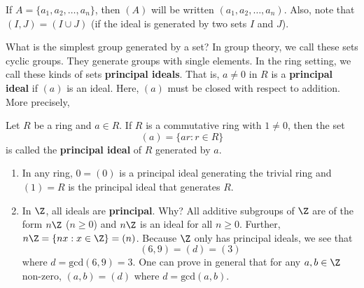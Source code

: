 If \( A = \{ {a}_{1}, {a}_{2}, \dots, {a}_{n} \}  \), then \( (A) \) will be written \( ({a}_{1}, {a}_{2}, \dots, {a}_{n}) \). Also, note that \( (I,J) = (I \cup J) \) (if the ideal is generated by two sets \( I  \) and \( J  \)).

What is the simplest group generated by a set? In group theory, we call these sets cyclic groups. They generate groups with single elements. In the ring setting, we call these kinds of sets \textbf{principal ideals}. That is, \( a \neq 0  \) in \( R  \) is a \textbf{principal ideal} if \( (a)  \) is an ideal. Here, \( (a) \) must be closed with respect to addition. More precisely, 

\begin{definition}
    Let \( R  \) be a ring and \( a \in R  \). If \( R  \) is a commutative ring with \( 1 \neq 0  \), then the set
    \[  (a) = \{  ar : r \in R  \}  \]
    is called the \textbf{principal ideal} of \( R  \) generated by \( a  \).
\end{definition}

\begin{eg}
   \begin{enumerate}
       \item[(1)] In any ring, \( 0 = (0)  \) is a principal ideal generating the trivial ring and \( (1) = R  \) is the principal ideal that generates \( R  \).
       \item[(2)] In \( \Z  \), all ideals are \textbf{principal}. Why? All additive subgroups of \( \Z  \) are of the form \( n \Z  \) (\( n \geq 0  \)) and \( n \Z  \) is an ideal for all \( n \geq 0  \). Further, \( n\Z = \{  n x : x \in \Z  \}  = (n) \). Because \( \Z  \) only has principal ideals, we see that 
           \[  (6,9) = (d) = (3) \]
           where \( d = \text{gcd}(6,9) = 3   \).
           One can prove in general that for any \( a,b \in \Z  \) non-zero, \( (a,b) = (d) \) where \( d = \text{gcd}(a,b)  \).
   \end{enumerate} 
\end{eg}

